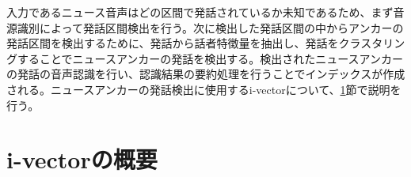 入力であるニュース音声はどの区間で発話されているか未知であるため、まず音源識別によって発話区間検出を行う。次に検出した発話区間の中からアンカーの発話区間を検出するために、発話から話者特徴量を抽出し、発話をクラスタリングすることでニュースアンカーの発話を検出する。検出されたニュースアンカーの発話の音声認識を行い、認識結果の要約処理を行うことでインデックスが作成される。ニュースアンカーの発話検出に使用するi-vectorについて、\ref{chapter:iv}節で説明を行う。

%

\section{i-vectorの概要}
\label{chapter:iv}


%
